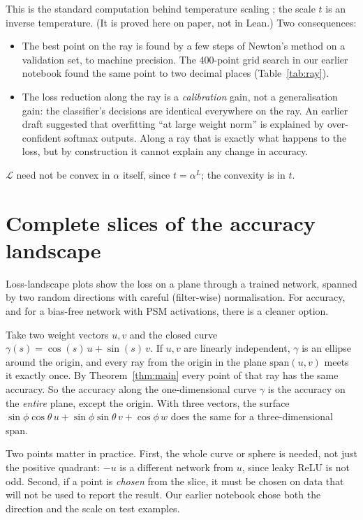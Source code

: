 \documentclass[11pt]{article}
\theoremstyle{definition}
\theoremstyle{remark}
\begin{document}
This is the standard computation behind temperature scaling \cite{guo2017calibration}; the scale
$t$ is an inverse temperature. (It is proved here on paper, not in Lean.) Two consequences:
\begin{itemize}
  \item The best point on the ray is found by a few steps of Newton's method on a validation set,
        to machine precision. The 400-point grid search in our earlier notebook found the same
        point to two decimal places (Table~\ref{tab:ray}).
  \item The loss reduction along the ray is a \emph{calibration} gain, not a generalisation gain:
        the classifier's decisions are identical everywhere on the ray. An earlier draft suggested
        that overfitting ``at large weight norm'' is explained by over-confident softmax outputs.
        Along a ray that is exactly what happens to the loss, but by construction it cannot
        explain any change in accuracy.
\end{itemize}
$\mathcal{L}$ need not be convex in $\alpha$ itself, since $t=\alpha^L$; the convexity is in $t$.

\section{Complete slices of the accuracy landscape}\label{sec:slices}

Loss-landscape plots \cite{li2018visualizing} show the loss on a plane through a trained network,
spanned by two random directions with careful (filter-wise) normalisation. For accuracy, and for a
bias-free network with PSM activations, there is a cleaner option.

Take two weight vectors $u,v$ and the closed curve $\gamma(s)=\cos(s)\,u+\sin(s)\,v$. If $u,v$ are
linearly independent, $\gamma$ is an ellipse around the origin, and every ray from the origin in
the plane $\mathrm{span}(u,v)$ meets it exactly once. By Theorem~\ref{thm:main} every point of that
ray has the same accuracy. So the accuracy along the one-dimensional curve $\gamma$ is the accuracy
on the \emph{entire} plane, except the origin. With three vectors, the surface
$\sin\phi\cos\theta\,u+\sin\phi\sin\theta\,v+\cos\phi\,w$ does the same for a three-dimensional
span.

Two points matter in practice. First, the whole curve or sphere is needed, not just the positive
quadrant: $-u$ is a different network from $u$, since leaky ReLU is not odd. Second, if a point
is \emph{chosen} from the slice, it must be chosen on data that will not be used to report the
result. Our earlier notebook chose both the direction and the scale on test examples.
\end{document}
